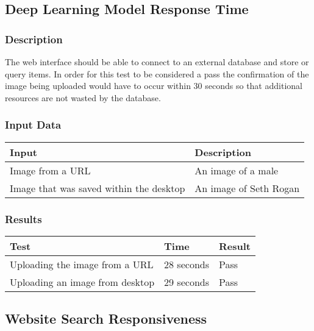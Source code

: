 \documentclass{scrreprt}
\begin{document}
\subsection{Deep Learning Model Response Time}
\subsubsection{Description}
\begin{flushleft}
The web interface should be able to connect to an external database and store or query items. In order for this test to be considered a pass the confirmation of the image being uploaded would have to occur within 30 seconds so that additional resources are not wasted by the database.

\subsubsection{Input Data}
 \centering
 \begin{tabular}{p{3cm}p{6cm}}
 \hline\hline
 Input & Description\\
 \hline\hline
  Image from a URL & An image of a male  \\
 \hline\hline
  Image that was saved within the desktop & An image of Seth Rogan \\
 \hline
 \end{tabular}
\subsubsection{Results}
\end{flushleft}
 \centering
 \begin{tabular}{||p{1.5cm}|p{1.5cm}|p{1.5cm}||}
 \hline
 \textbf Test & \textbf Time & \textbf Result \\
 \hline\hline
  Uploading the image from a URL & 28 seconds  & Pass\\
 \hline\hline
  Uploading an image from desktop & 29 seconds & Pass\\
 \hline
 \end{tabular}
\vspace{1cm}

 \subsection{Website Search Responsiveness}
\end{document}
